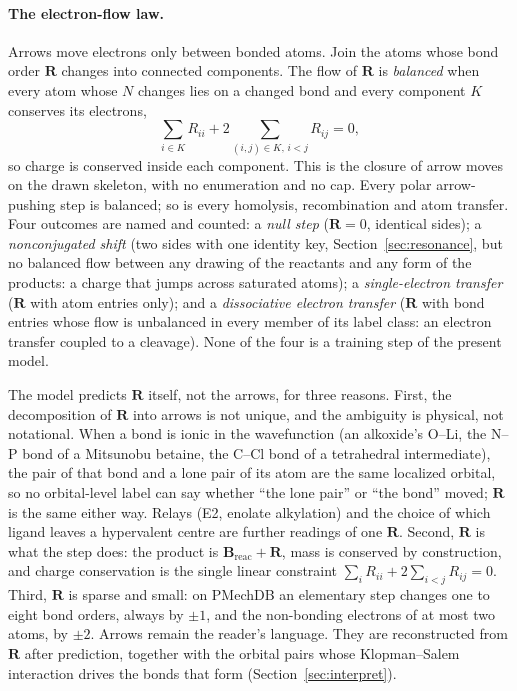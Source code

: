 \documentclass[11pt,a4paper]{article}
\newcommand{\vb}[1]{\bm{#1}}
\begin{document}
\paragraph{The electron-flow law.} Arrows move electrons only between bonded atoms. Join the atoms whose bond order $\vb{R}$ changes into connected components. The flow of $\vb{R}$ is \emph{balanced} when every atom whose $N$ changes lies on a changed bond and every component $K$ conserves its electrons,
\begin{equation}
\sum_{i\in K}R_{ii}+2\sum_{(i,j)\in K,\,i<j}R_{ij}=0,
\label{eq:flow}
\end{equation}
so charge is conserved inside each component. This is the closure of arrow moves on the drawn skeleton, with no enumeration and no cap. Every polar arrow-pushing step is balanced; so is every homolysis, recombination and atom transfer. Four outcomes are named and counted: a \emph{null step} ($\vb{R}=0$, identical sides); a \emph{nonconjugated shift} (two sides with one identity key, Section~\ref{sec:resonance}, but no balanced flow between any drawing of the reactants and any form of the products: a charge that jumps across saturated atoms); a \emph{single-electron transfer} ($\vb{R}$ with atom entries only); and a \emph{dissociative electron transfer} ($\vb{R}$ with bond entries whose flow is unbalanced in every member of its label class: an electron transfer coupled to a cleavage). None of the four is a training step of the present model.

The model predicts $\vb{R}$ itself, not the arrows, for three reasons. First, the decomposition of $\vb{R}$ into arrows is not unique, and the ambiguity is physical, not notational. When a bond is ionic in the wavefunction (an alkoxide's O--Li, the N--P bond of a Mitsunobu betaine, the C--Cl bond of a tetrahedral intermediate), the pair of that bond and a lone pair of its atom are the same localized orbital, so no orbital-level label can say whether ``the lone pair'' or ``the bond'' moved; $\vb{R}$ is the same either way. Relays (E2, enolate alkylation) and the choice of which ligand leaves a hypervalent centre are further readings of one $\vb{R}$. Second, $\vb{R}$ is what the step does: the product is $\vb{B}_{\mathrm{reac}}+\vb{R}$, mass is conserved by construction, and charge conservation is the single linear constraint $\sum_i R_{ii}+2\sum_{i<j}R_{ij}=0$. Third, $\vb{R}$ is sparse and small: on PMechDB an elementary step changes one to eight bond orders, always by $\pm1$, and the non-bonding electrons of at most two atoms, by $\pm2$. Arrows remain the reader's language. They are reconstructed from $\vb{R}$ after prediction, together with the orbital pairs whose Klopman--Salem interaction drives the bonds that form (Section~\ref{sec:interpret}).
\end{document}
